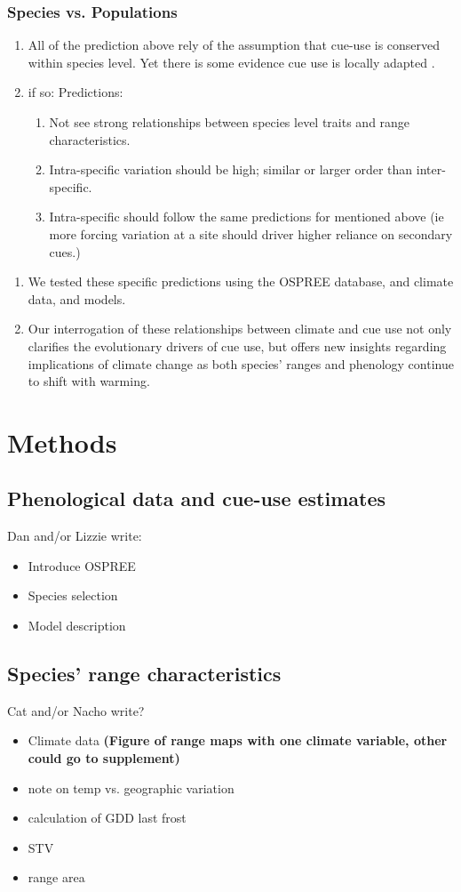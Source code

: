 \documentclass[11pt]{article}\usepackage[]{graphicx}\usepackage[]{color}
\begin{document}
\subsubsection{Species vs. Populations}
\begin{enumerate}
\item All of the prediction above rely of the assumption that cue-use is conserved within species level. Yet there is some evidence cue use is locally adapted \citep{}.
\item if so: Predictions:
\begin{enumerate}
\item Not see strong relationships between species level traits and range characteristics.
\item Intra-specific variation should be high; similar or larger order than inter-specific.
\item Intra-specific should follow the same predictions for mentioned above (ie more forcing variation at a site should driver higher reliance on secondary cues.)
\end{enumerate}
\end{enumerate}
\begin{enumerate}
\item We tested these specific predictions using the OSPREE database, and climate data, and models. %
\item Our interrogation of these relationships between climate and cue use not only clarifies the evolutionary drivers of cue use, but offers new insights regarding implications of climate change as both species' ranges and phenology continue to shift with warming.
\end{enumerate}
\section*{Methods}
\subsection*{Phenological data and cue-use estimates}
Dan and/or Lizzie write:
\begin{itemize}
\item Introduce OSPREE
\item Species selection
\item Model description
\end{itemize}

\subsection*{Species' range characteristics}
Cat and/or Nacho write?\\
\begin{itemize}
\item Climate data \textbf{(Figure of range maps with one climate variable, other could go to supplement)}
\item note on temp vs. geographic variation
\item calculation of GDD last frost
\item STV
\item range area
\end{itemize}
\end{document}
